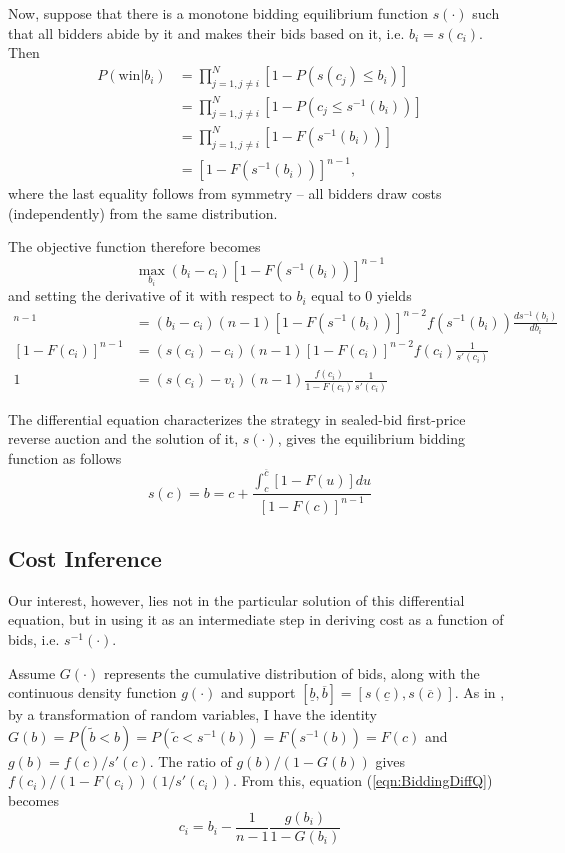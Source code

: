 \documentclass[11pt]{article}
\begin{document}
Now, suppose that there is a monotone bidding equilibrium function $s(\cdot)$ such that 
all bidders abide by it and makes their bids based on it, i.e. $b_i = s(c_i)$. 
Then
\begin{align*}
    P(\text{win}|b_i) &= \prod_{j=1, j \neq i}^{N}[1-P(s(c_j) \leq b_i)] \\ 
        &= \prod_{j=1, j \neq i}^{N}[1-P(c_j \leq s^{-1}(b_i))] \\ 
        &= \prod_{j=1, j \neq i}^{N}[1-F(s^{-1}(b_i))] \\ 
        &= [1-F(s^{-1}(b_i))]^{n-1}, 
\end{align*}
where the last equality follows from symmetry -- all bidders draw costs (independently) 
from the same distribution. 

The objective function therefore becomes 
$$ \max_{b_i} (b_i - c_i)[1-F(s^{-1}(b_i))]^{n-1}$$ 
and setting the derivative of it with respect to $b_i$ equal to 0 yields
\begin{align}
    [1-F(s^{-1}(b_i))]^{n-1} &= (b_i -c_i)(n-1)[1-F(s^{-1}(b_i))]^{n-2}f(s^{-1}(b_i))\frac{d s^{-1}(b_i)}{d b_i} \nonumber \\
    [1-F(c_i)]^{n-1} &= (s(c_i) -c_i)(n-1)[1-F(c_i)]^{n-2}f(c_i)\frac{1}{s'(c_i)} \nonumber \\
    1 &= (s(c_i)-v_i)(n-1)\frac{f(c_i)}{1-F(c_i)}\frac{1}{s'(c_i)}     \label{eqn:BiddingDiffQ}
\end{align}

The differential equation characterizes the strategy in sealed-bid first-price 
reverse auction and the solution of it, $s(\cdot)$, gives the equilibrium 
bidding function as follows \cite{HubbardPaarsch2009}
\begin{equation}
    s(c) = b =  c + \frac{\int_c^{\overline{c}} [1 - F(u)] du}{[1 - F(c)]^{n-1}}
    \label{eqn:BiddingFunction}
\end{equation}


\subsection{Cost Inference}
Our interest, however, lies not in the particular solution 
of this differential equation, but in using it as an intermediate step 
in deriving cost as a function of bids, i.e. $s^{-1}(\cdot)$.

Assume $G(\cdot)$ represents the cumulative distribution of bids, 
along with the continuous density function $g(\cdot)$ and support 
$[\underline{b}, \overline{b}] = [s(\underline{c}), s(\overline{c})]$.
As in \citeauthor{Guerreetal2000} \citeyear{Guerreetal2000}, by a transformation of random variables, I have the identity 
$G(b) = P(\tilde{b} < b) = P(\tilde{c} < s^{-1}(b)) = F(s^{-1}(b)) = F(c)$
and $g(b) = f(c) /s'(c)$. The ratio of $g(b)/(1 - G(b))$ gives 
$f(c_i)/(1-F(c_i))(1/s'(c_i))$. From this, equation (\ref{eqn:BiddingDiffQ}) becomes 
\begin{equation}
    \label{eqn:ReverseFunction}
    c_i = b_i - \frac{1}{n-1}\frac{g(b_i)}{1-G(b_i)}
\end{equation}
\end{document}
